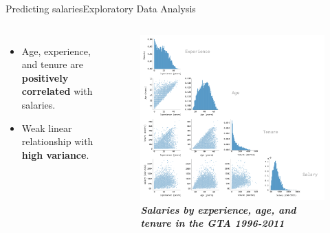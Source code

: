 \documentclass[aspectratio=169, xcolor=dvipsnames]{beamer}
\begin{document}
\begin{frame}{Predicting salaries}{Exploratory Data Analysis}
    \vspace*{-80pt}
    \begin{columns}
            \begin{itemize}
                \setlength{\itemsep}{10pt} %
                \item \fontsize{10pt}{12pt}\selectfont Age, experience, and tenure are \textbf{positively correlated} with salaries.
                \item \fontsize{10pt}{12pt}\selectfont Weak linear relationship with \textbf{high variance}.
            \end{itemize}
            \begin{figure}
                \centering
                \includegraphics[width=1.1\textwidth]{./images/pairplot.png}
                \captionsetup{labelformat=empty}
                \setlength{\abovecaptionskip}{-16pt}
                \caption{\fontsize{8pt}{8pt}\selectfont \textbf{\textit{Salaries by experience, age, and tenure in the GTA 1996-2011}}}
            \end{figure}
    \end{columns}
\end{frame} 
\end{document}

